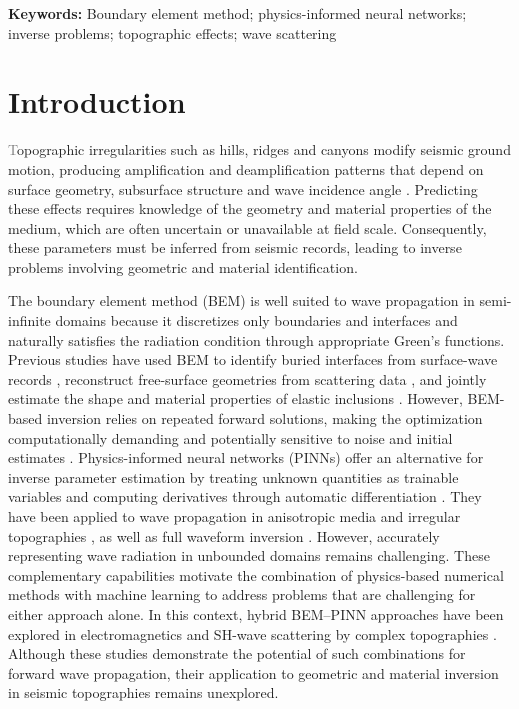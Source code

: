 \documentclass[11pt,twoside]{article}
\begin{document}
\noindent\textbf{Keywords:} Boundary element method; physics-informed neural networks; inverse problems; topographic effects; wave scattering

\section*{Introduction}\label{sec:introduction}

\lettrine[lines=2,loversize=0.15,findent=0.4em,nindent=0em]{\textcolor{gray}{T}}{}opographic irregularities such as hills, ridges and canyons modify seismic ground motion, producing amplification and deamplification patterns that depend on surface geometry, subsurface structure and wave incidence angle \citep{Bard1982,Kawase1988}. Predicting these effects requires knowledge of the geometry and material properties of the medium, which are often uncertain or unavailable at field scale. Consequently, these parameters must be inferred from seismic records, leading to inverse problems involving geometric and material identification.

The boundary element method (BEM) is well suited to wave propagation in semi-infinite domains because it discretizes only boundaries and interfaces and naturally satisfies the radiation condition through appropriate Green's functions. Previous studies have used BEM to identify buried interfaces from surface-wave records \citep{Bignardi2012}, reconstruct free-surface geometries from scattering data \citep{Wang2018}, and jointly estimate the shape and material properties of elastic inclusions \citep{Bonnet2009}. However, BEM-based inversion relies on repeated forward solutions, making the optimization computationally demanding and potentially sensitive to noise and initial estimates \citep{Kallivokas2009,Chien2005}. Physics-informed neural networks (PINNs) offer an alternative for inverse parameter estimation by treating unknown quantities as trainable variables and computing derivatives through automatic differentiation \citep{Raissi2019}. They have been applied to wave propagation in anisotropic media and irregular topographies \citep{Song2022}, as well as full waveform inversion \citep{RashtBehesht2022}. However, accurately representing wave radiation in unbounded domains remains challenging. These complementary capabilities motivate the combination of physics-based numerical methods with machine learning to address problems that are challenging for either approach alone. In this context, hybrid BEM–PINN approaches have been explored in electromagnetics \citep{Barmada2024} and SH-wave scattering by complex topographies \citep{wu_novel_2026}. Although these studies demonstrate the potential of such combinations for forward wave propagation, their application to geometric and material inversion in seismic topographies remains unexplored.
\end{document}
